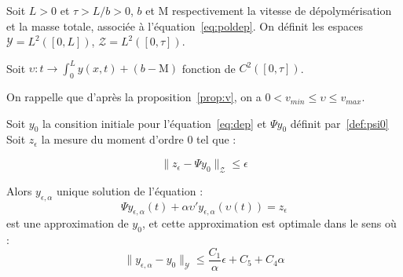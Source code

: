 \documentclass[a4paper]{article}
\newcommand{\mass}{\mathrm{M}}
\newcommand{\dep}{b}
\newcommand{\Y}{\mathscr{Y}}
\newcommand{\Z}{\mathscr{Z}}
\newcommand{\yea}{y_{\epsilon, \alpha}}
\begin{document}
\begin{proposition}
	Soit $L>0$ et $\tau> L/\dep>0$, $\dep$ et $\mass$ respectivement la vitesse de dépolymérisation et la masse totale, associée à l'équation~\eqref{eq:poldep}.
	On définit les espaces $\Y = L^2([0,L])$, $\Z = L^2([0,\tau])$.
	
	Soit $\upsilon :t \to \int_0^L y(x,t) + (\dep-\mass) $ fonction de $C^2([0,\tau])$.
	
	On rappelle que d'après la proposition~\ref{prop:v}, 
	on a $0< v_{min} \leq \upsilon \leq v_{max}$.
	
	
	Soit $y_0$ la consition initiale pour l'équation~\eqref{eq:dep}
	et $\Psi y_0$ définit par~\eqref{def:psi0}
	Soit $z_{\epsilon}$ la mesure du moment d'ordre 0 tel que :
	
	\[ \|z_{\epsilon} - \Psi y_0 \|_{\Z} \leq \epsilon \]
	
	Alors $\yea$ unique solution de l'équation :
	\begin{equation}
		 \Psi \yea(t) + \alpha \upsilon'\yea(\upsilon(t)) = z_{\epsilon} 
	\end{equation}
	est une approximation de $y_0$, et cette approximation est optimale 
	dans le sens où :
	\[ \| \displaystyle \yea - y_0 \|_{\Y} \leq 
	                 \frac{C_1}{\alpha} \epsilon 
					 + C_5
					 + C_4 \alpha \]
					
	
\end{proposition}
	
\end{document}
